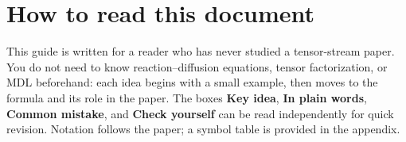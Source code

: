 \documentclass[11pt,a4paper]{article}
\begin{document}
\hypersetup{pageanchor=false}
\DTTitlePage
\hypersetup{pageanchor=true}

\section*{How to read this document}
This guide is written for a reader who has never studied a tensor-stream paper. You do not
need to know reaction--diffusion equations, tensor factorization, or MDL beforehand: each
idea begins with a small example, then moves to the formula and its role in the paper. The
boxes \textbf{Key idea}, \textbf{In plain words}, \textbf{Common mistake}, and
\textbf{Check yourself} can be read independently for quick revision. Notation follows the
paper; a symbol table is provided in the appendix.

\tableofcontents
\clearpage











\appendix


\end{document}
